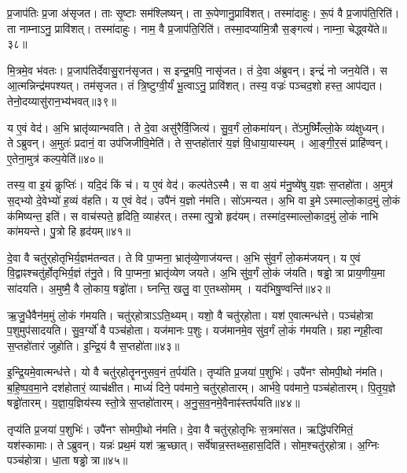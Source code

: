 प्र॒जाप॑तिः प्र॒जा अ॑सृजत।
ताः सृ॒ष्टाः सम॑श्लिष्यन्।
ता रू॒पेणानु॒प्रावि॑शत्।
तस्मा॑दाहुः।
रू॒पं वै प्र॒जाप॑ति॒रिति॑।
ता नाम्नाऽनु॒ प्रावि॑शत्।
तस्मा॑दाहुः।
नाम॒ वै प्र॒जाप॑ति॒रिति॑।
तस्मा॒दप्या॑मि॒त्रौ स॒ङ्गत्य॑।
नाम्ना॒ चेद्ध्वये॑ते॥३८॥

मि॒त्रमे॒व भ॑वतः।
प्र॒जाप॑तिर्देवासु॒रान॑सृजत।
स इन्द्र॒मपि॒ नासृ॑जत।
तं दे॒वा अ॑ब्रुवन्।
इन्द्रं॑ नो जन॒येति॑।
स आ॒त्मन्निन्द्र॑मपश्यत्।
तम॑सृजत।
तं त्रि॒ष्टुग्वी॒र्यं॑ भू॒त्वाऽनु॒ प्रावि॑शत्।
तस्य॒ वज्रः॑ पञ्चद॒शो हस्त॒ आप॑द्यत।
तेनो॒दय्यासु॑रान॒भ्य॑भवत्॥३९॥

य ए॒वं वेद॑।
अ॒भि भ्रातृ॑व्यान्भवति।
ते दे॒वा असु॑रैर्वि॒जित्य॑।
सु॒व॒र्गं लो॒कमा॑यन्।
ते॑ऽमुष्मिँ॑ल्लो॒के व्य॑क्षुध्यन्।
तेऽब्रुवन्।
अ॒मुतः॑ प्रदानं॒ वा उप॑जिजीवि॒मेति॑।
ते स॒प्तहो॑तारं य॒ज्ञं वि॒धाया॒यास्यम्।
आ॒ङ्गी॒र॒सं प्राहि॑ण्वन्।
ए॒तेना॒मुत्र॑ कल्प॒येति॑॥४०॥

तस्य॒ वा इ॒यं कॢप्तिः॑।
यदि॒दं किं च॑।
य ए॒वं वेद॑।
कल्प॑ते\-ऽस्मै।
स वा अ॒यं म॑नु॒ष्ये॑षु य॒ज्ञः स॒प्तहो॑ता।
अ॒मुत्र॑ स॒द्भ्यो दे॒वेभ्यो॑ ह॒व्यं व॑हति।
य ए॒वं वेद॑।
उपै॑नं य॒ज्ञो न॑मति।
सो॑ऽमन्यत।
अ॒भि वा इ॒मे\-ऽस्माल्लो॒काद॒मुं लो॒कं क॑मिष्यन्त॒ इति॑।
स वाच॑स्पते॒ हृदिति॒ व्याह॑रत्।
तस्मात्पु॒त्रो हृद॑यम्।
तस्मा॑द॒स्माल्लो॒काद॒मुं लो॒कं नाभि का॑मयन्ते।
पु॒त्रो हि हृद॑यम्॥४१॥\anuvakamend[ह्वये॑ते अभवत्कल्प॒येतीति॑ च॒त्वारि॑ च]

दे॒वा वै चतु॑र्‌\mbox{}होतृभिर्य॒ज्ञम॑तन्वत।
ते वि पा॒प्मना॒ भ्रातृ॑व्ये॒णाज॑यन्त।
अ॒भि सु॑व॒र्गं लो॒कम॑जयन्।
य ए॒वं वि॒द्वाꣴश्चतु॑र्\mbox{}होतृभिर्य॒ज्ञं त॑नु॒ते।
वि पा॒प्मना॒ भ्रातृ॑व्येण जयते।
अ॒भि सु॑व॒र्गं लो॒कं ज॑यति।
षड्ढोत्रा प्राय॒णीय॒मा सा॑दयति।
अ॒मुष्मै॒ वै लो॒काय॒ षड्ढो॑ता।
घ्नन्ति॒ खलु॒ वा ए॒तथ्सोमम्।
यद॑भिषु॒ण्वन्ति॑॥४२॥

ऋ॒जु॒धैवैन॑म॒मुं लो॒कं ग॑मयति।
चतु॑र्‌\mbox{}होत्रा\-ऽऽति॒थ्यम्।
यशो॒ वै चतु॑र्‌\mbox{}होता।
यश॑ ए॒वात्मन्ध॑त्ते।
पञ्च॑होत्रा प॒शुमुप॑सादयति।
सु॒व॒र्ग्यो॑ वै पञ्च॑होता।
यज॑मानः प॒शुः।
यज॑मानमे॒व सु॑व॒र्गं लो॒कं ग॑मयति।
ग्रहान्गृही॒त्वा स॒प्तहो॑तारं जुहोति।
इ॒न्द्रि॒यं वै स॒प्तहो॑ता॥४३॥

इ॒न्द्रि॒यमे॒वात्मन्ध॑त्ते।
यो वै चतु॑र्‌\mbox{}होतॄननुसव॒नं त॒र्पय॑ति।
तृप्य॑ति प्र॒जया॑ प॒शुभिः॑।
उपै॑नꣳ सोमपी॒थो न॑मति।
ब॒हि॒ष्प॒व॒मा॒ने दश॑होतारं॒ व्याच॑क्षीत।
माध्यं॑ दिने॒ पव॑माने॒ चतु॑र्‌\mbox{}होतारम्।
आर्भ॑वे॒ पव॑माने॒ पञ्च॑होतारम्।
पि॒तृ॒य॒ज्ञे षड्ढो॑तारम्।
य॒ज्ञा॒य॒ज्ञिय॑स्य स्तो॒त्रे स॒प्तहो॑तारम्।
अ॒नु॒स॒व॒नमे॒वैनाꣴ॑स्तर्पयति॥४४॥

तृप्य॑ति प्र॒जया॑ प॒शुभिः॑।
उपै॑नꣳ सोमपी॒थो न॑मति।
दे॒वा वै चतु॑र्‌\mbox{}होतृभिः स॒त्रमा॑सत।
ऋद्धि॑परिमितं॒ यश॑स्कामाः।
तेऽब्रुवन्।
यन्नः॑ प्रथ॒मं यश॑ ऋ॒च्छात्।
सर्वे॑षान्न॒स्तथ्स॒हास॒दिति॑।
सोम॒श्चतु॑र्‌\mbox{}होत्रा।
अ॒ग्निः पञ्च॑होत्रा।
धा॒ता षड्ढोत्रा॥४५॥

